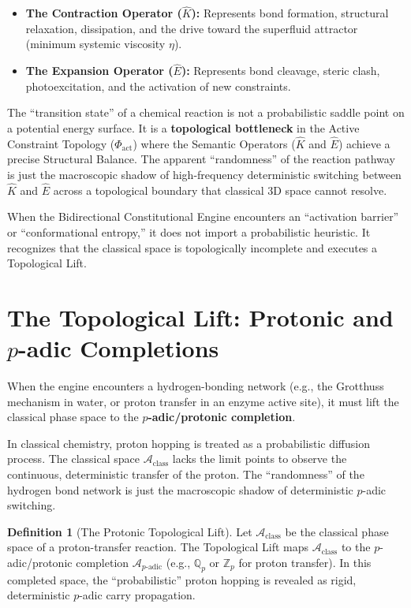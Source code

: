 \documentclass[11pt,openany]{extbook}
\theoremstyle{plain}
\theoremstyle{definition}
\newtheorem{definition}{Definition}[chapter]
\begin{document}
\begin{itemize}
    \item \textbf{The Contraction Operator ($\hat{K}$):} Represents bond formation, structural relaxation, dissipation, and the drive toward the superfluid attractor (minimum systemic viscosity $\eta$).
    \item \textbf{The Expansion Operator ($\hat{E}$):} Represents bond cleavage, steric clash, photoexcitation, and the activation of new constraints.
\end{itemize}

The ``transition state'' of a chemical reaction is not a probabilistic saddle point on a potential energy surface. It is a \textbf{topological bottleneck} in the Active Constraint Topology ($\Phi_{\text{act}}$) where the Semantic Operators ($\hat{K}$ and $\hat{E}$) achieve a precise Structural Balance. The apparent ``randomness'' of the reaction pathway is just the macroscopic shadow of high-frequency deterministic switching between $\hat{K}$ and $\hat{E}$ across a topological boundary that classical 3D space cannot resolve.

When the Bidirectional Constitutional Engine encounters an ``activation barrier'' or ``conformational entropy,'' it does not import a probabilistic heuristic. It recognizes that the classical space is topologically incomplete and executes a Topological Lift.

\section{The Topological Lift: Protonic and $p$-adic Completions}

When the engine encounters a hydrogen-bonding network (e.g., the Grotthuss mechanism in water, or proton transfer in an enzyme active site), it must lift the classical phase space to the \textbf{$p$-adic/protonic completion}.

In classical chemistry, proton hopping is treated as a probabilistic diffusion process. The classical space $\mathcal{A}_{\text{class}}$ lacks the limit points to observe the continuous, deterministic transfer of the proton. The ``randomness'' of the hydrogen bond network is just the macroscopic shadow of deterministic $p$-adic switching.

\begin{definition}[The Protonic Topological Lift]
Let $\mathcal{A}_{\text{class}}$ be the classical phase space of a proton-transfer reaction. The Topological Lift maps $\mathcal{A}_{\text{class}}$ to the $p$-adic/protonic completion $\mathcal{A}_{p\text{-adic}}$ (e.g., $\mathbb{Q}_p$ or $\mathbb{Z}_p$ for proton transfer). In this completed space, the ``probabilistic'' proton hopping is revealed as rigid, deterministic $p$-adic carry propagation.
\end{definition}
\end{document}
